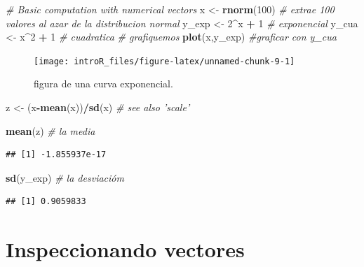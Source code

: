 \documentclass[
]{book}
\newenvironment{Shaded}{\begin{snugshade}}{\end{snugshade}}
\newcommand{\CommentTok}[1]{\textcolor[rgb]{0.56,0.35,0.01}{\textit{#1}}}
\newcommand{\DecValTok}[1]{\textcolor[rgb]{0.00,0.00,0.81}{#1}}
\newcommand{\KeywordTok}[1]{\textcolor[rgb]{0.13,0.29,0.53}{\textbf{#1}}}
\newcommand{\NormalTok}[1]{#1}
\newcommand{\OperatorTok}[1]{\textcolor[rgb]{0.81,0.36,0.00}{\textbf{#1}}}
\newcommand{\StringTok}[1]{\textcolor[rgb]{0.31,0.60,0.02}{#1}}
\begin{document}
\begin{Shaded}
\begin{Highlighting}[]
\CommentTok{# Basic computation with numerical vectors}
\NormalTok{x <-}\StringTok{ }\KeywordTok{rnorm}\NormalTok{(}\DecValTok{100}\NormalTok{) }\CommentTok{# extrae 100 valores al azar de la distribucion normal}
\NormalTok{y_exp <-}\StringTok{ }\DecValTok{2}\OperatorTok{^}\NormalTok{x }\OperatorTok{+}\StringTok{ }\DecValTok{1} \CommentTok{# exponencial}
\NormalTok{y_cua <-}\StringTok{ }\NormalTok{x}\OperatorTok{^}\DecValTok{2} \OperatorTok{+}\StringTok{ }\DecValTok{1} \CommentTok{# cuadratica}
\CommentTok{# grafiquemos}
\KeywordTok{plot}\NormalTok{(x,y_exp) }\CommentTok{#graficar con y_cua}
\end{Highlighting}
\end{Shaded}

\begin{figure}

{\centering \texttt{[image: introR\_files/figure-latex/unnamed-chunk-9-1]} 

}

\caption{figura de una curva exponencial.}\label{fig:unnamed-chunk-9}
\end{figure}

\begin{Shaded}
\begin{Highlighting}[]
\NormalTok{z <-}\StringTok{ }\NormalTok{(x}\OperatorTok{-}\KeywordTok{mean}\NormalTok{(x))}\OperatorTok{/}\KeywordTok{sd}\NormalTok{(x)  }\CommentTok{# see also 'scale'}

\KeywordTok{mean}\NormalTok{(z) }\CommentTok{# la media}
\end{Highlighting}
\end{Shaded}

\begin{verbatim}
## [1] -1.855937e-17
\end{verbatim}

\begin{Shaded}
\begin{Highlighting}[]
\KeywordTok{sd}\NormalTok{(y_exp) }\CommentTok{# la desviacióm}
\end{Highlighting}
\end{Shaded}

\begin{verbatim}
## [1] 0.9059833
\end{verbatim}

\hypertarget{inspeccionando-vectores}{%
\section{Inspeccionando vectores}\label{inspeccionando-vectores}}
\end{document}
